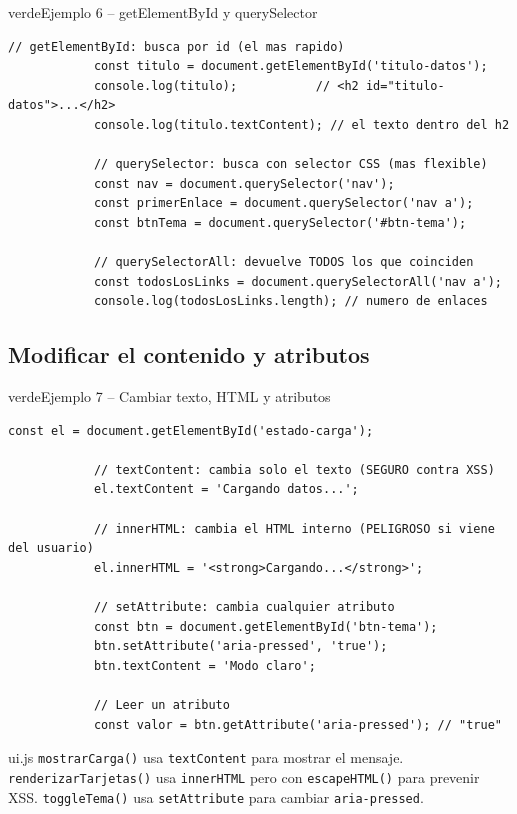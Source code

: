 \documentclass[11pt,a4paper]{article}
\begin{document}
	\begin{cajacodigo}{verde}{Ejemplo 6 -- getElementById y querySelector}
		\begin{lstlisting}[style=codejs]
			// getElementById: busca por id (el mas rapido)
			const titulo = document.getElementById('titulo-datos');
			console.log(titulo);           // <h2 id="titulo-datos">...</h2>
			console.log(titulo.textContent); // el texto dentro del h2
			
			// querySelector: busca con selector CSS (mas flexible)
			const nav = document.querySelector('nav');
			const primerEnlace = document.querySelector('nav a');
			const btnTema = document.querySelector('#btn-tema');
			
			// querySelectorAll: devuelve TODOS los que coinciden
			const todosLosLinks = document.querySelectorAll('nav a');
			console.log(todosLosLinks.length); // numero de enlaces
		\end{lstlisting}
	\end{cajacodigo}
	
	\subsection{Modificar el contenido y atributos}
	
	\begin{cajacodigo}{verde}{Ejemplo 7 -- Cambiar texto, HTML y atributos}
		\begin{lstlisting}[style=codejs]
			const el = document.getElementById('estado-carga');
			
			// textContent: cambia solo el texto (SEGURO contra XSS)
			el.textContent = 'Cargando datos...';
			
			// innerHTML: cambia el HTML interno (PELIGROSO si viene del usuario)
			el.innerHTML = '<strong>Cargando...</strong>';
			
			// setAttribute: cambia cualquier atributo
			const btn = document.getElementById('btn-tema');
			btn.setAttribute('aria-pressed', 'true');
			btn.textContent = 'Modo claro';
			
			// Leer un atributo
			const valor = btn.getAttribute('aria-pressed'); // "true"
		\end{lstlisting}
	\end{cajacodigo}
	
	\begin{cajapractica}{ui.js}
		\texttt{mostrarCarga()} usa \texttt{textContent} para mostrar el mensaje. \texttt{renderizarTarjetas()} usa \texttt{innerHTML} pero con \texttt{escapeHTML()} para prevenir XSS. \texttt{toggleTema()} usa \texttt{setAttribute} para cambiar \texttt{aria-pressed}.
	\end{cajapractica}
	
\end{document}
